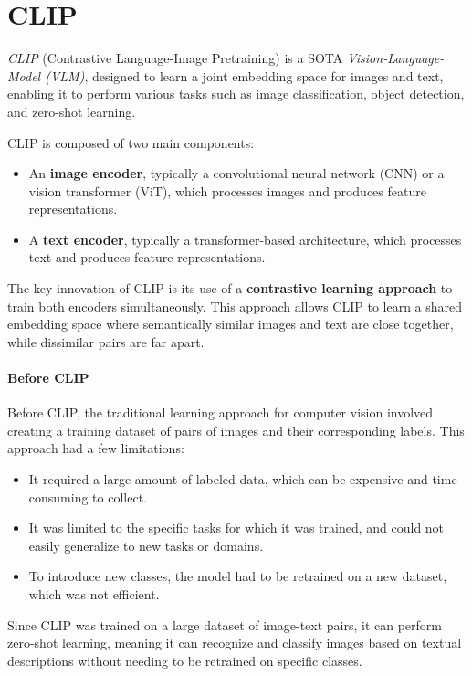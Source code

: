 \section{CLIP}
\textit{CLIP} (Contrastive Language-Image Pretraining) is a SOTA \textit{Vision-Language-Model (VLM)}, designed to learn a joint embedding space for images and text, 
enabling it to perform various tasks such as image classification, object detection, and zero-shot learning.

CLIP is composed of two main components:
\begin{itemize}
    \item An \textbf{image encoder}, typically a convolutional neural network (CNN) or a vision transformer (ViT), which processes images and produces feature representations.
    \item A \textbf{text encoder}, typically a transformer-based architecture, which processes text and produces feature representations.
\end{itemize}
The key innovation of CLIP is its use of a \textbf{contrastive learning approach} to train both encoders simultaneously. This approach allows
CLIP to learn a shared embedding space where semantically similar images and text are close together, while dissimilar pairs are far apart.

\paragraph{Before CLIP}
Before CLIP, the traditional learning approach for computer vision involved creating a training dataset of pairs of images and their corresponding labels.
This approach had a few limitations:
\begin{itemize}
    \item It required a large amount of labeled data, which can be expensive and time-consuming to collect.
    \item It was limited to the specific tasks for which it was trained, and could not easily generalize to new tasks or domains.
    \item To introduce new classes, the model had to be retrained on a new dataset, which was not efficient.
\end{itemize}
Since CLIP was trained on a large dataset of image-text pairs, it can perform zero-shot learning, meaning it can recognize and classify images based on textual descriptions without needing to be retrained on specific classes.

